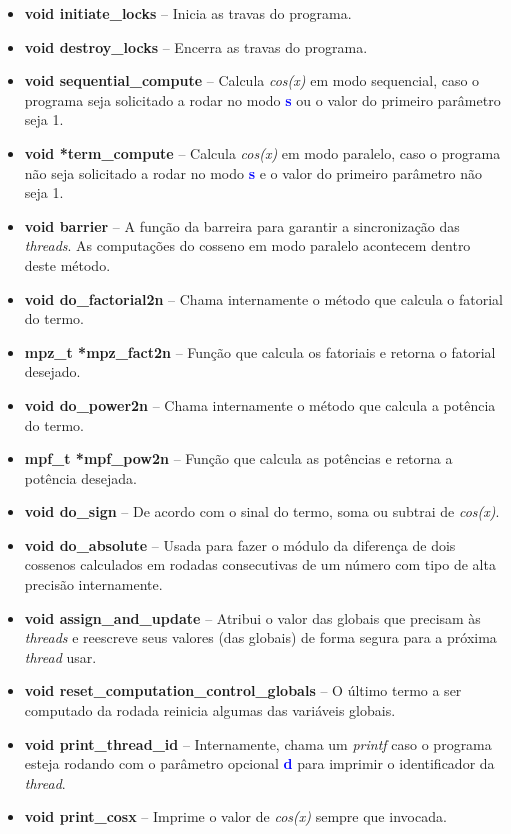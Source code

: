 \documentclass[11pt]{article}
\begin{document}
\begin{itemize}
	\item \textbf{\textcolor{sblue}{void} initiate\_locks} -- Inicia as travas do programa.
	\item \textbf{\textcolor{sblue}{void} destroy\_locks} -- Encerra as travas do programa.
	\item \textbf{\textcolor{sblue}{void} sequential\_compute} -- Calcula \textit{cos(x)} em modo sequencial, caso o programa seja solicitado a rodar no modo \textbf{\textcolor{blue}{s}} ou o valor do primeiro parâmetro seja 1.
	\item \textbf{\textcolor{sblue}{void} *term\_compute} -- Calcula \textit{cos(x)} em modo paralelo, caso o programa não seja solicitado a rodar no modo \textbf{\textcolor{blue}{s}} e o valor do primeiro parâmetro não seja 1.
	\item \textbf{\textcolor{sblue}{void} barrier} -- A função da barreira para garantir a sincronização das \textit{threads}. As computações do cosseno em modo paralelo acontecem dentro deste método.
	\item \textbf{\textcolor{sblue}{void} do\_factorial2n} -- Chama internamente o método que calcula o fatorial do termo.
	\item \textbf{\textcolor{sblue}{mpz\_t} *mpz\_fact2n} -- Função que calcula os fatoriais e retorna o fatorial desejado.
	\item \textbf{\textcolor{sblue}{void} do\_power2n} -- Chama internamente o método que calcula a potência do termo.
	\item \textbf{\textcolor{sblue}{mpf\_t} *mpf\_pow2n} -- Função que calcula as potências e retorna a potência desejada.
	\item \textbf{\textcolor{sblue}{void} do\_sign} -- De acordo com o sinal do termo, soma ou subtrai de \textit{cos(x)}.
	\item \textbf{\textcolor{sblue}{void} do\_absolute} -- Usada para fazer o módulo da diferença de dois cossenos calculados em rodadas consecutivas de um número com tipo de alta precisão internamente.
	\item \textbf{\textcolor{sblue}{void} assign\_and\_update} -- Atribui o valor das globais que precisam às \textit{threads} e reescreve seus valores (das globais) de forma segura para a próxima \textit{thread} usar.
	\item \textbf{\textcolor{sblue}{void} reset\_computation\_control\_globals} -- O último termo a ser computado da rodada reinicia algumas das variáveis globais.
	\item \textbf{\textcolor{sblue}{void} print\_thread\_id} -- Internamente, chama um \textit{printf} caso o programa esteja rodando com o parâmetro opcional \textbf{\textcolor{blue}{d}} para imprimir o identificador da \textit{thread}.
	\item \textbf{\textcolor{sblue}{void} print\_cosx} -- Imprime o valor de \textit{cos(x)} sempre que invocada. 
\end{itemize}
\end{document}
